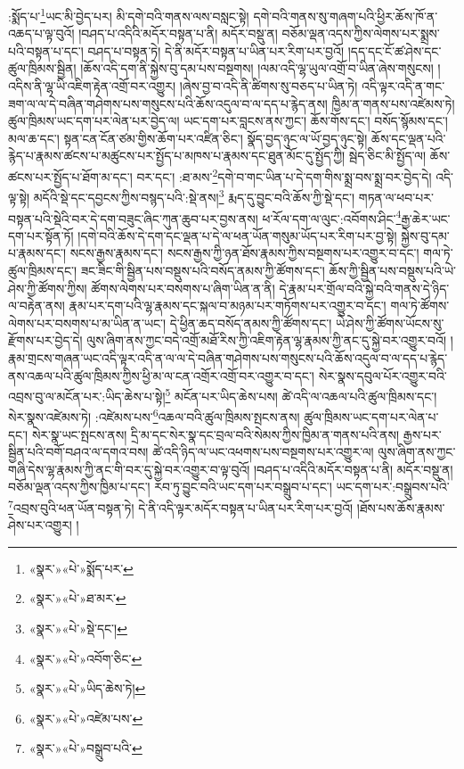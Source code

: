 :སྨོད་པ་\footnote{«སྣར་»«པེ་»སྨོད་པར་}ཡང་མི་བྱེད་པར། མི་དགེ་བའི་གནས་ལས་བསླང་སྟེ། དགེ་བའི་གནས་སུ་གཞག་པའི་ཕྱིར་ཆོས་ཁོ་ན་འཆད་པ་ལྟ་བུའོ། །བཤད་པ་འདིའི་མདོར་བསྟན་པ་ནི། མདོར་བསྡུ་ན། བཅོམ་ལྡན་འདས་ཀྱིས་ལེགས་པར་སྨྲས་པའི་བསྟན་པ་དང་། བཤད་པ་བསྟན་ཏེ། དེ་ནི་མདོར་བསྟན་པ་ཡིན་པར་རིག་པར་བྱའོ། །དད་དང་ངོ་ཚ་ཤེས་དང་ཚུལ་ཁྲིམས་སྦྱིན། །ཆོས་འདི་དག་ནི་སྐྱེས་བུ་དམ་པས་བསྔགས། །ལམ་འདི་ལྷ་ཡུལ་འགྲོ་བ་ཡིན་ཞེས་གསུངས། །འདིས་ནི་ལྷ་ཡི་འཇིག་རྟེན་འགྲོ་བར་འགྱུར། །ཞེས་བྱ་བ་འདི་ནི་ཚིགས་སུ་བཅད་པ་ཡིན་ཏེ། འདི་ལྟར་འདི་ན་གང་ཟག་ལ་ལ་དེ་བཞིན་གཤེགས་པས་གསུངས་པའི་ཆོས་འདུལ་བ་ལ་དད་པ་རྙེད་ནས། ཁྱིམ་ན་གནས་པས་འཛེམས་ཏེ། ཚུལ་ཁྲིམས་ཡང་དག་པར་ལེན་པར་བྱེད་ལ། ཡང་དག་པར་བླངས་ནས་ཀྱང་། ཆོས་གོས་དང་། བསོད་སྙོམས་དང་། མལ་ཆ་དང་། སྟན་ངན་ངོན་ཙམ་གྱིས་ཆོག་པར་འཛིན་ཅིང་། སྣོད་བྱད་ཉུང་ལ་ཡོ་བྱད་ཉུང་སྟེ། ཆོས་དང་ལྡན་པའི་རྙེད་པ་རྣམས་ཚངས་པ་མཚུངས་པར་སྤྱོད་པ་མཁས་པ་རྣམས་དང་ཐུན་མོང་དུ་སྤྱོད་ཀྱི། སྦེད་ཅིང་མི་སྤྱོད་ལ། ཆོས་ཚངས་པར་སྤྱོད་པ་ཐོག་མ་དང་། བར་དང་། :ཐ་མས་\footnote{«སྣར་»«པེ་»ཐ་མར་}དགེ་བ་གང་ཡིན་པ་དེ་དག་གིས་སྨྲ་བས་སྨྲ་བར་བྱེད་དེ། འདི་ལྟ་སྟེ། མདོའི་སྡེ་དང་དབྱངས་ཀྱིས་བསྙད་པའི་:སྡེ་ནས།\footnote{«སྣར་»«པེ་»སྡེ་དང་།} རྨད་དུ་བྱུང་བའི་ཆོས་ཀྱི་སྡེ་དང་། གཏན་ལ་ཕབ་པར་བསྟན་པའི་སྡེའི་བར་དེ་དག་བཟུང་ཞིང་ཀུན་ཆུབ་པར་བྱས་ནས། ཕ་རོལ་དག་ལ་ལུང་:འབོགས་ཤིང་\footnote{«སྣར་»«པེ་»འབོག་ཅིང་}རྒྱ་ཆེར་ཡང་དག་པར་སྟོན་ཏོ། །དགེ་བའི་ཆོས་དེ་དག་དང་ལྡན་པ་དེ་ལ་ཕན་ཡོན་གསུམ་ཡོད་པར་རིག་པར་བྱ་སྟེ། སྐྱེས་བུ་དམ་པ་རྣམས་དང་། སངས་རྒྱས་རྣམས་དང་། སངས་རྒྱས་ཀྱི་ཉན་ཐོས་རྣམས་ཀྱིས་བསྔགས་པར་འགྱུར་བ་དང་། གལ་ཏེ་ཚུལ་ཁྲིམས་དང་། ཟང་ཟིང་གི་སྦྱིན་པས་བསྡུས་པའི་བསོད་ནམས་ཀྱི་ཚོགས་དང་། ཆོས་ཀྱི་སྦྱིན་པས་བསྡུས་པའི་ཡེ་ཤེས་ཀྱི་ཚོགས་ཀྱིས། ཚོགས་ལེགས་པར་བསགས་པ་ཞིག་ཡིན་ན་ནི། དེ་རྣམ་པར་གྲོལ་བའི་སྐྱེ་བའི་གནས་དེ་ཉིད་ལ་བརྟེན་ནས། རྣམ་པར་དག་པའི་ལྷ་རྣམས་དང་སྐལ་བ་མཉམ་པར་གཏོགས་པར་འགྱུར་བ་དང་། གལ་ཏེ་ཚོགས་ལེགས་པར་བསགས་པ་མ་ཡིན་ན་ཡང་། དེ་ཕྱིན་ཆད་བསོད་ནམས་ཀྱི་ཚོགས་དང་། ཡེ་ཤེས་ཀྱི་ཚོགས་ཡོངས་སུ་རྫོགས་པར་བྱེད་དེ། ལུས་ཞིག་ནས་ཀྱང་བདེ་འགྲོ་མཐོ་རིས་ཀྱི་འཇིག་རྟེན་ལྷ་རྣམས་ཀྱི་ནང་དུ་སྐྱེ་བར་འགྱུར་བའོ། །རྣམ་གྲངས་གཞན་ཡང་འདི་ལྟར་འདི་ན་ལ་ལ་དེ་བཞིན་གཤེགས་པས་གསུངས་པའི་ཆོས་འདུལ་བ་ལ་དད་པ་རྙེད་ནས་འཆལ་པའི་ཚུལ་ཁྲིམས་ཀྱིས་ཕྱི་མ་ལ་ངན་འགྲོར་འགྲོ་བར་འགྱུར་བ་དང་། སེར་སྣས་དབུལ་པོར་འགྱུར་བའི་འབྲས་བུ་ལ་མངོན་པར་:ཡིད་ཆེས་པ་སྟེ།\footnote{«སྣར་»«པེ་»ཡིད་ཆེས་ཏེ།} མངོན་པར་ཡིད་ཆེས་པས། ཚེ་འདི་ལ་འཆལ་པའི་ཚུལ་ཁྲིམས་དང་། སེར་སྣས་འཛེམས་ཏེ། :འཛེམས་པས་\footnote{«སྣར་»«པེ་»འཛེམ་པས་}འཆལ་བའི་ཚུལ་ཁྲིམས་སྤངས་ནས། ཚུལ་ཁྲིམས་ཡང་དག་པར་ལེན་པ་དང་། སེར་སྣ་ཡང་སྤངས་ནས། དྲི་མ་དང་སེར་སྣ་དང་བྲལ་བའི་སེམས་ཀྱིས་ཁྱིམ་ན་གནས་པའི་ནས། རྒྱས་པར་སྦྱིན་པའི་བགོ་བཤའ་ལ་དགའ་བས། ཚེ་འདི་ཉིད་ལ་ཡང་འཕགས་པས་བསྔགས་པར་འགྱུར་ལ། ལུས་ཞིག་ནས་ཀྱང་གཞི་དེས་ལྷ་རྣམས་ཀྱི་ནང་གི་བར་དུ་སྐྱེ་བར་འགྱུར་བ་ལྟ་བུའོ། །བཤད་པ་འདིའི་མདོར་བསྟན་པ་ནི། མདོར་བསྡུ་ན། བཅོམ་ལྡན་འདས་ཀྱིས་ཁྱིམ་པ་དང་། རབ་ཏུ་བྱུང་བའི་ཡང་དག་པར་བསྒྲུབ་པ་དང་། ཡང་དག་པར་:བསྒྲུབས་པའི་\footnote{«སྣར་»«པེ་»བསྒྲུབ་པའི་}འབྲས་བུའི་ཕན་ཡོན་བསྟན་ཏེ། དེ་ནི་འདི་ལྟར་མདོར་བསྟན་པ་ཡིན་པར་རིག་པར་བྱའོ། །ཐོས་པས་ཆོས་རྣམས་ཤེས་པར་འགྱུར། །
